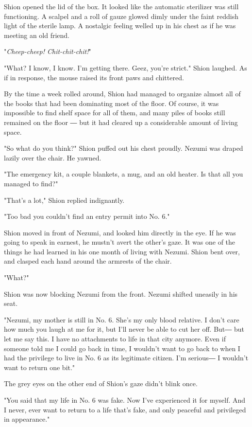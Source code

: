 Shion opened the lid of the box. It looked like the automatic sterilizer
was still functioning. A scalpel and a roll of gauze glowed dimly under
the faint reddish light of the sterile lamp. A nostalgic feeling welled
up in his chest as if he was meeting an old friend.

"\emph{Cheep-cheep! Chit-chit-chit!}"

"What? I know, I know. I'm getting there. Geez, you're strict." Shion
laughed. As if in response, the mouse raised its front paws and
chittered.

\mybreak

By the time a week rolled around, Shion had managed to organize almost
all of the books that had been dominating most of the floor. Of course,
it was impossible to find shelf space for all of them, and many piles of
books still remained on the floor ― but it had cleared up a considerable
amount of living space.

"So what do you think?" Shion puffed out his chest proudly. Nezumi was
draped lazily over the chair. He yawned.

"The emergency kit, a couple blankets, a mug, and an old heater. Is that
all you managed to find?"

"That's a lot," Shion replied indignantly.

"Too bad you couldn't find an entry permit into No. 6."

Shion moved in front of Nezumi, and looked him directly in the eye. If
he was going to speak in earnest, he mustn't avert the other's gaze. It
was one of the things he had learned in his one month of living with
Nezumi. Shion bent over, and clasped each hand around the armrests of
the chair.

"What?"

Shion was now blocking Nezumi from the front. Nezumi shifted uneasily in
his seat.

"Nezumi, my mother is still in No. 6. She's my only blood relative. I
don't care how much you laugh at me for it, but I'll never be able to
cut her off. But― but let me say this. I have no attachments to life in
that city anymore. Even if someone told me I could go back in time, I
wouldn't want to go back to when I had the privilege to live in No. 6 as
its legitimate citizen. I'm serious― I wouldn't want to return one bit."

The grey eyes on the other end of Shion's gaze didn't blink once.

"You said that my life in No. 6 was fake. Now I've experienced it for
myself. And I never, ever want to return to a life that's fake, and only
peaceful and privileged in appearance."

